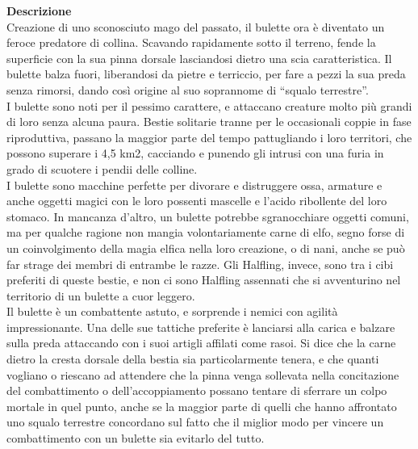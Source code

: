 \begin{multicols}{2}
\textbf{Descrizione}\\
Creazione di uno sconosciuto mago del passato, il bulette ora è diventato un feroce predatore di collina. Scavando rapidamente sotto il terreno, fende la superficie con la sua pinna dorsale lasciandosi dietro una scia caratteristica. Il bulette balza fuori, liberandosi da pietre e terriccio, per fare a pezzi la sua preda senza rimorsi, dando così origine al suo soprannome di “squalo terrestre”.\\
I bulette sono noti per il pessimo carattere, e attaccano creature molto più grandi di loro senza alcuna paura. Bestie solitarie tranne per le occasionali coppie in fase riproduttiva, passano la maggior parte del tempo pattugliando i loro territori, che possono superare i 4,5 km2, cacciando e punendo gli intrusi con una furia in grado di scuotere i pendii delle colline.\\
I bulette sono macchine perfette per divorare e distruggere ossa, armature e anche oggetti magici con le loro possenti mascelle e l'acido ribollente del loro stomaco. In mancanza d'altro, un bulette potrebbe sgranocchiare oggetti comuni, ma per qualche ragione non mangia volontariamente carne di elfo, segno forse di un coinvolgimento della magia elfica nella loro creazione, o di nani, anche se può far strage dei membri di entrambe le razze. Gli Halfling, invece, sono tra i cibi preferiti di queste bestie, e non ci sono Halfling assennati che si avventurino nel territorio di un bulette a cuor leggero.\\
Il bulette è un combattente astuto, e sorprende i nemici con agilità impressionante. Una delle sue tattiche preferite è lanciarsi alla carica e balzare sulla preda attaccando con i suoi artigli affilati come rasoi. Si dice che la carne dietro la cresta dorsale della bestia sia particolarmente tenera, e che quanti vogliano o riescano ad attendere che la pinna venga sollevata nella concitazione del combattimento o dell'accoppiamento possano tentare di sferrare un colpo mortale in quel punto, anche se la maggior parte di quelli che hanno affrontato uno squalo terrestre concordano sul fatto che il miglior modo per vincere un combattimento con un bulette sia evitarlo del tutto.\\


\end{multicols}
